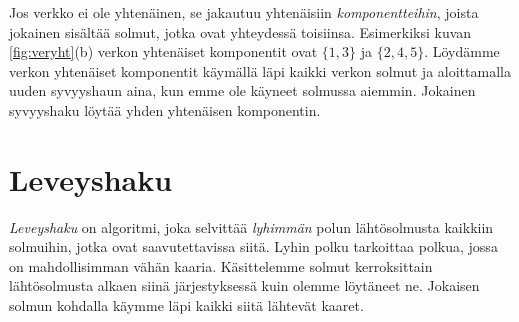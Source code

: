 Jos verkko ei ole yhtenäinen, se jakautuu
yhtenäisiin \emph{komponentteihin},
joista jokainen sisältää solmut, jotka ovat yhteydessä
toisiinsa.
Esimerkiksi kuvan \ref{fig:veryht}(b) verkon
yhtenäiset komponentit ovat $\{1,3\}$ ja $\{2,4,5\}$.
Löydäm\-me verkon yhtenäiset komponentit
käymällä läpi kaikki verkon solmut ja aloittamalla
uuden syvyyshaun aina, kun emme ole käyneet solmussa aiemmin.
Jokainen syvyyshaku löytää yhden yhtenäisen komponentin.

\section{Leveyshaku}

\emph{Leveyshaku} on algoritmi, joka selvittää \emph{lyhimmän} polun
lähtösolmusta kaikkiin solmuihin, jotka ovat saavutettavissa siitä.
Lyhin polku tarkoittaa polkua, jossa on mahdollisimman vähän kaaria.
Käsittelemme solmut kerroksittain lähtösolmusta alkaen
siinä järjestyksessä kuin olemme löytäneet ne.
Jokaisen solmun kohdalla käymme läpi kaikki siitä lähtevät kaaret.

